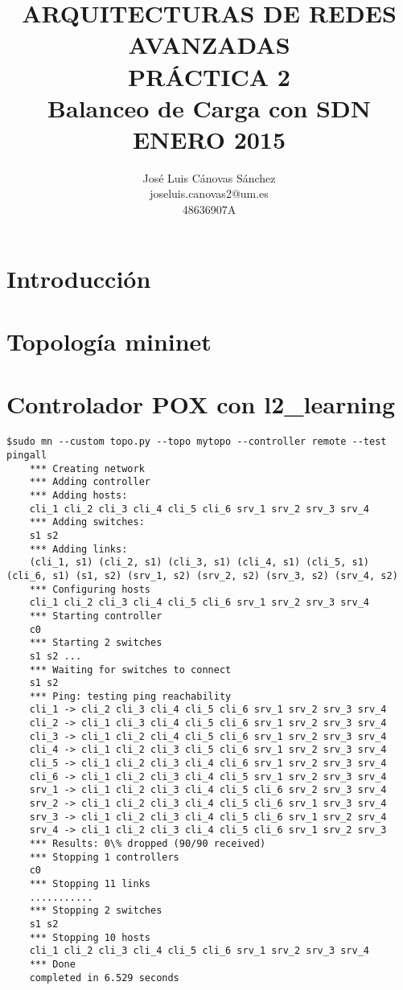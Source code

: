 \documentclass{article}
\author{José Luis Cánovas Sánchez\\joseluis.canovas2@um.es\\48636907A}
\title{ARQUITECTURAS DE REDES AVANZADAS\\PRÁCTICA 2\\Balanceo de Carga con SDN\\ ENERO 2015}
\date{}
\begin{document}
\maketitle

\begin{abstract}

\end{abstract}

\tableofcontents

\section{Introducción}

\section{Topología mininet}


\section{Controlador POX con l2\_learning}


\begin{BVerbatim}
$sudo mn --custom topo.py --topo mytopo --controller remote --test pingall
	*** Creating network
	*** Adding controller
	*** Adding hosts:
	cli_1 cli_2 cli_3 cli_4 cli_5 cli_6 srv_1 srv_2 srv_3 srv_4
	*** Adding switches:
	s1 s2
	*** Adding links:
	(cli_1, s1) (cli_2, s1) (cli_3, s1) (cli_4, s1) (cli_5, s1) (cli_6, s1) (s1, s2) (srv_1, s2) (srv_2, s2) (srv_3, s2) (srv_4, s2)
	*** Configuring hosts
	cli_1 cli_2 cli_3 cli_4 cli_5 cli_6 srv_1 srv_2 srv_3 srv_4
	*** Starting controller
	c0
	*** Starting 2 switches
	s1 s2 ...
	*** Waiting for switches to connect
	s1 s2
	*** Ping: testing ping reachability
	cli_1 -> cli_2 cli_3 cli_4 cli_5 cli_6 srv_1 srv_2 srv_3 srv_4
	cli_2 -> cli_1 cli_3 cli_4 cli_5 cli_6 srv_1 srv_2 srv_3 srv_4
	cli_3 -> cli_1 cli_2 cli_4 cli_5 cli_6 srv_1 srv_2 srv_3 srv_4
	cli_4 -> cli_1 cli_2 cli_3 cli_5 cli_6 srv_1 srv_2 srv_3 srv_4
	cli_5 -> cli_1 cli_2 cli_3 cli_4 cli_6 srv_1 srv_2 srv_3 srv_4
	cli_6 -> cli_1 cli_2 cli_3 cli_4 cli_5 srv_1 srv_2 srv_3 srv_4
	srv_1 -> cli_1 cli_2 cli_3 cli_4 cli_5 cli_6 srv_2 srv_3 srv_4
	srv_2 -> cli_1 cli_2 cli_3 cli_4 cli_5 cli_6 srv_1 srv_3 srv_4
	srv_3 -> cli_1 cli_2 cli_3 cli_4 cli_5 cli_6 srv_1 srv_2 srv_4
	srv_4 -> cli_1 cli_2 cli_3 cli_4 cli_5 cli_6 srv_1 srv_2 srv_3
	*** Results: 0\% dropped (90/90 received)
	*** Stopping 1 controllers
	c0
	*** Stopping 11 links
	...........
	*** Stopping 2 switches
	s1 s2
	*** Stopping 10 hosts
	cli_1 cli_2 cli_3 cli_4 cli_5 cli_6 srv_1 srv_2 srv_3 srv_4
	*** Done
	completed in 6.529 seconds
\end{BVerbatim}
\end{document}
